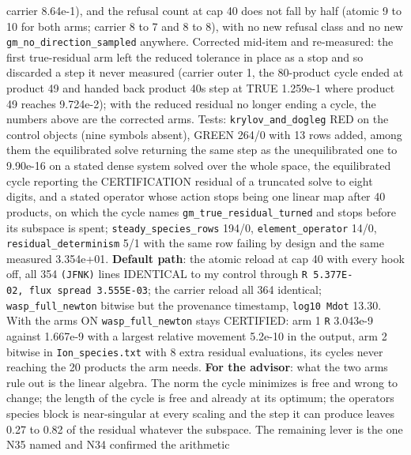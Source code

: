 \documentclass[english,a4paper]{my_memo}
\begin{document}
\begin{itemize}
  carrier 8.64e-1), and the refusal count at cap 40 does not fall by half
  (atomic 9 to 10 for both arms; carrier 8 to 7 and 8 to 8), with no new
  refusal class and no new \texttt{gm\_no\_direction\_sampled} anywhere. Corrected
  mid-item and re-measured: the first true-residual arm left the reduced
  tolerance in place as a stop and so discarded a step it never measured
  (carrier outer 1, the 80-product cycle ended at product 49 and handed
  back product 40\textquotesingle s step at TRUE 1.259e-1 where product 49 reaches
  9.724e-2); with the reduced residual no longer ending a cycle, the
  numbers above are the corrected arm\textquotesingle s. Tests: \texttt{krylov\_and\_dogleg} RED on
  the control objects (nine symbols absent), GREEN 264/0 with 13 rows
  added, among them the equilibrated solve returning the same step as the
  unequilibrated one to 9.90e-16 on a stated dense system solved over the
  whole space, the equilibrated cycle reporting the CERTIFICATION residual
  of a truncated solve to eight digits, and a stated operator whose action
  stops being one linear map after 40 products, on which the cycle names
  \texttt{gm\_true\_residual\_turned} and stops before its subspace is spent;
  \texttt{steady\_species\_rows} 194/0, \texttt{element\_operator} 14/0,
  \texttt{residual\_determinism} 5/1 with the same row failing by design and the
  same measured 3.354e+01. \textbf{Default path}: the atomic reload at cap 40
  with every hook off, all 354 \texttt{(JFNK)} lines IDENTICAL to my control
  through \texttt{\textbar{}\textbar{}R\textbar{}\textbar{}\ 5.377E-02,\ flux\ spread\ 3.555E-03}; the carrier reload all
  364 identical; \texttt{wasp\_full\_newton} bitwise but the provenance timestamp,
  \texttt{log10\ Mdot} 13.30. With the arms ON \texttt{wasp\_full\_newton} stays CERTIFIED:
  arm 1 \texttt{\textbar{}\textbar{}R\textbar{}\textbar{}} 3.043e-9 against 1.667e-9 with a largest relative movement
  5.2e-10 in the output, arm 2 bitwise in \texttt{Ion\_species.txt} with 8 extra
  residual evaluations, its cycles never reaching the 20 products the arm
  needs. \textbf{For the advisor}: what the two arms rule out is the linear
  algebra. The norm the cycle minimizes is free and wrong to change; the
  length of the cycle is free and already at its optimum; the operator\textquotesingle s
  species block is near-singular at every scaling and the step it can
  produce leaves 0.27 to 0.82 of the residual whatever the subspace. The
  remaining lever is the one N35 named and N34 confirmed the arithmetic

\end{itemize}
\end{document}
